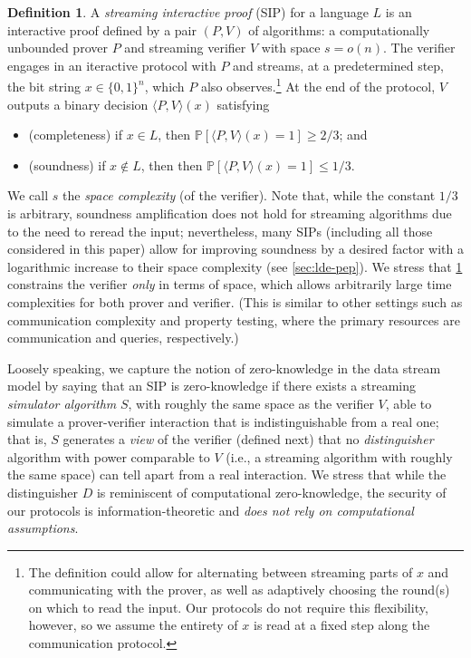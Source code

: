 \documentclass[10pt,a4paper]{article}
\theoremstyle{definition}
\newtheorem{definition}[theorem]{Definition}
\renewcommand{\P}{\mathbb P}
\newcommand{\bitset}{\{0,1\}}
\begin{document}
\begin{definition}
    \label{def:sip}
    A \emph{streaming interactive proof} (SIP) for a language $L$ is an interactive proof defined by a pair $(P,V)$ of algorithms: a computationally unbounded prover $P$ and streaming verifier $V$ with space $s = o(n)$. The verifier engages in an iteractive protocol with $P$ and streams, at a predetermined step, the bit string $x \in \bitset^n$, which $P$ also observes.\footnote{The definition could allow for alternating between streaming parts of $x$ and communicating with the prover, as well as adaptively choosing the round(s) on which to read the input. Our protocols do not require this flexibility, however, so we assume the entirety of $x$ is read at a fixed step along the communication protocol.} At the end of the protocol, $V$ outputs a binary decision $\langle P,V \rangle(x)$ satisfying
    \begin{itemize}
        \item (completeness) if $x \in L$, then $\P[\langle P,V \rangle(x) = 1] \geq 2/3$; and
        \item (soundness) if $x \notin L$, then then $\P[\langle P,V \rangle(x) = 1] \leq 1/3$.
    \end{itemize}
\end{definition}

We call $s$ the \emph{space complexity} (of the verifier).
Note that, while the constant $1/3$ is arbitrary, soundness amplification does not hold for streaming algorithms due to the need to reread the input; nevertheless, many SIPs (including all those considered in this paper) allow for improving soundness by a desired factor with a logarithmic increase to their space complexity (see \cref{sec:lde-pep}). We stress that \cref{def:sip} constrains the verifier \emph{only} in terms of space, which allows arbitrarily large time complexities for both prover and verifier. (This is similar to other settings such as communication complexity and property testing, where the primary resources are communication and queries, respectively.)

Loosely speaking, we capture the notion of zero-knowledge in the data stream model by saying that an SIP is zero-knowledge if there exists a streaming \emph{simulator algorithm} $S$, with roughly the same space as the verifier $V$, able to simulate a prover-verifier interaction that is indistinguishable from a real one; that is, $S$ generates a \emph{view} of the verifier (defined next) that no \emph{distinguisher} algorithm with power comparable to $V$ (i.e., a streaming algorithm with roughly the same space) can tell apart from a real interaction. We stress that while the distinguisher $D$ is reminiscent of computational zero-knowledge, the security of our protocols is information-theoretic and \emph{does not rely on computational assumptions}.
\end{document}
